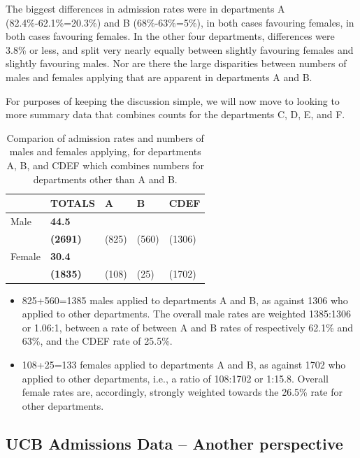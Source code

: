 \documentclass[
  10pt,
  b5paper]{book}
\providecommand{\tightlist}{%
  \setlength{\itemsep}{0pt}\setlength{\parskip}{0pt}}
\begin{document}
The biggest differences in admission rates were in departments
A (82.4\%-62.1\%=20.3\%) and B (68\%-63\%=5\%), in both cases favouring females, in both cases favouring females. In the other four
departments, differences were 3.8\% or less, and split very nearly
equally between slightly favouring females and slightly favouring
males. Nor are there the large disparities between numbers of
males and females applying that are apparent in departments
A and B.

For purposes of keeping the discussion simple, we will
now move to looking to more summary data that combines counts
for the departments C, D, E, and F.

\begin{table}[H]

\caption{Comparion of admission rates and numbers of males and
females applying, for departments A, B, and CDEF which combines 
numbers for departments other than A and B.}
\centering
\begin{tabular}[t]{l>{\raggedleft\arraybackslash}p{5em}>{\raggedleft\arraybackslash}p{2.25em}>{\raggedleft\arraybackslash}p{2.25em}>{\raggedleft\arraybackslash}p{2.25em}}
\toprule
  & TOTALS & A & B & CDEF\\
\midrule
Male & \textbf{44.5} & 62.1 & 63 & 25.5\\
 & \textbf{(2691)} & (825) & (560) & (1306)\\
Female & \textbf{30.4} & 82.4 & 68 & 26.5\\
 & \textbf{(1835)} & (108) & (25) & (1702)\\
\bottomrule
\end{tabular}
\end{table}

\begin{itemize}
\tightlist
\item
  825+560=1385 males applied to departments A and B, as against
  1306 who applied to other departments. The overall male rates
  are weighted 1385:1306 or 1.06:1, between a rate of between
  A and B rates of respectively 62.1\% and 63\%, and the CDEF rate
  of 25.5\%.\\
\item
  108+25=133 females applied to departments A and B, as against
  1702 who applied to other departments, i.e., a ratio of
  108:1702 or 1:15.8. Overall female rates are, accordingly,
  strongly weighted towards the 26.5\% rate for other departments.
\end{itemize}

\hypertarget{ucb-admissions-data-another-perspective}{%
\subsection*{UCB Admissions Data -- Another perspective}\label{ucb-admissions-data-another-perspective}}
\end{document}
